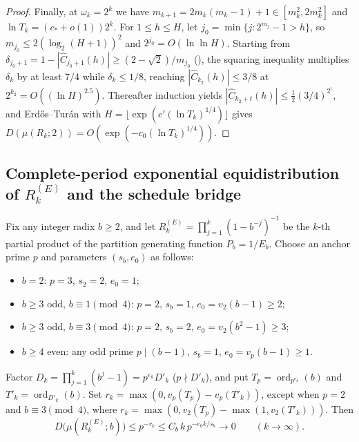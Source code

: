 \documentclass[11pt]{article}
\DeclareMathOperator{\ord}{ord}
\begin{document}
\begin{proof}
Finally, at $\omega_k=2^k$ we have $m_{k+1}=2m_k(m_k-1)+1\in[m_k^2,2m_k^2]$ and $\ln T_k=(c_*+o(1))2^k$. For $1\le h\le H$, let $j_0=\min\{j:2^{m_j}-1>h\}$, so $m_{j_0}\le 2(\log_2(H+1))^2$ and $2^{j_0}=O(\ln\ln H)$. Starting from $\delta_{j_0+1}=1-|\widehat C_{j_0+1}(h)|\ge(2-\sqrt2)/m_{j_0}$ (), the squaring inequality multiplies $\delta_k$ by at least $7/4$ while $\delta_k\le1/8$, reaching $|\widehat C_{k_2}(h)|\le 3/8$ at $2^{k_2}=O((\ln H)^{2.5})$. Thereafter induction yields $|\widehat C_{k_2+t}(h)|\le\frac12(3/4)^{2^t}$, and Erd\H{o}s--Tur\'an with $H=\lfloor\exp(c'(\ln T_k)^{1/4})\rfloor$ gives $D(\mu(R_k;2))=O(\exp(-c_0(\ln T_k)^{1/4}))$.
\end{proof}

\subsection{Complete-period exponential equidistribution of $R_k^{(E)}$ and the schedule bridge}

\begin{theorem}\label{thm:partition-partial}
Fix any integer radix $b\ge2$, and let $R_k^{(E)}=\prod_{j=1}^k(1-b^{-j})^{-1}$ be the $k$-th partial product of the partition generating function $P_b=1/E_b$. Choose an anchor prime $p$ and parameters $(s_b,e_0)$ as follows:
\begin{itemize}[nosep]
\item $b=2$: $p=3$, $s_2=2$, $e_0=1$;
\item $b\ge3$ odd, $b\equiv1\pmod4$: $p=2$, $s_b=1$, $e_0=v_2(b-1)\ge2$;
\item $b\ge3$ odd, $b\equiv3\pmod4$: $p=2$, $s_b=2$, $e_0=v_2(b^2-1)\ge3$;
\item $b\ge4$ even: any odd prime $p\mid(b-1)$, $s_b=1$, $e_0=v_p(b-1)\ge1$.
\end{itemize}
Factor $D_k=\prod_{j=1}^k(b^j-1)=p^{e_k}D'_k$ ($p\nmid D'_k$), and put $T_p=\ord_{p^{e_k}}(b)$ and $T'_k=\ord_{D'_k}(b)$. Set $r_k=\max(0,v_p(T_p)-v_p(T'_k))$, except when $p=2$ and $b\equiv3\pmod4$, where $r_k=\max(0,v_2(T_p)-\max(1,v_2(T'_k)))$. Then
\[
D\bigl(\mu(R_k^{(E)};b)\bigr)\le p^{-r_k}\le C_b\,k\,p^{-e_0 k/s_b}\longrightarrow0\qquad(k\to\infty).
\]
\end{theorem}
\end{document}
